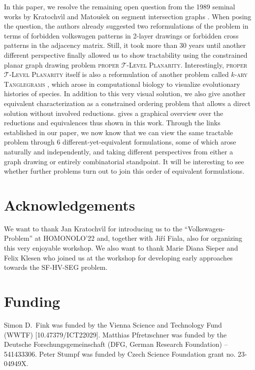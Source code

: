 \documentclass[runningheads]{llncs}
\newcommand{\tlp}{\textsc{proper $\mathcal T$-Level Planarity}\xspace}
\newcommand{\hvp}{\textsc{SF-HV-SEG}\xspace}
\begin{document}
In this paper, we resolve the remaining open question from the 1989 seminal works by Kratochv{\'\i}l and Matou{\v s}ek on segment intersection graphs \cite{km-igo-94,kra-asp-94,nf-ppa-92}.
When posing the question, the authors already suggested two reformulations of the problem in terms of forbidden volkswagen patterns in 2-layer drawings or forbidden cross patterns in the adjacency matrix.
Still, it took more than 30 years until another different perspective finally allowed us to show tractability using the constrained planar graph drawing problem \tlp.
Interestingly, \tlp itself is also a reformulation of another problem called \textsc{$k$-ary Tanglegrams} \cite{wsp-gkatl-12,albfr-ibpcl-15}, which arose in computational biology to visualize evolutionary histories of species.
In addition to this very visual solution, we also give another equivalent characterization as a constrained ordering problem that allows a direct solution without involved reductions.
 gives a graphical overview over the reductions and equivalences thus shown in this work.
Through the links established in our paper, we now know that we can view the same tractable problem through 6 different-yet-equivalent formulations, some of which arose naturally and independently, and taking different perspectives from either a graph drawing or entirely combinatorial standpoint.
It will be interesting to see whether further problems turn out to join this order of equivalent formulations.


\appendix
\section{Acknowledgements}
We want to thank Jan Kratochv{\'\i}l for introducing us to the ``Volkswagen-Problem'' at HOMONOLO'22 and, together with Jiří Fiala, also for organizing this very enjoyable workshop.
We also want to thank Marie Diana Sieper and Felix Klesen who joined us at the workshop for developing early approaches towards the \hvp problem.


\section{Funding}
Simon D.\ Fink was funded by the Vienna Science and Technology Fund (WWTF) [10.47379/ICT22029].
Matthias Pfretzschner was funded by the Deutsche Forschungsgemeinschaft (DFG, German Research Foundation) -- 541433306.
Peter Stumpf was funded by Czech Science Foundation grant no.
23-04949X.



\end{document}
